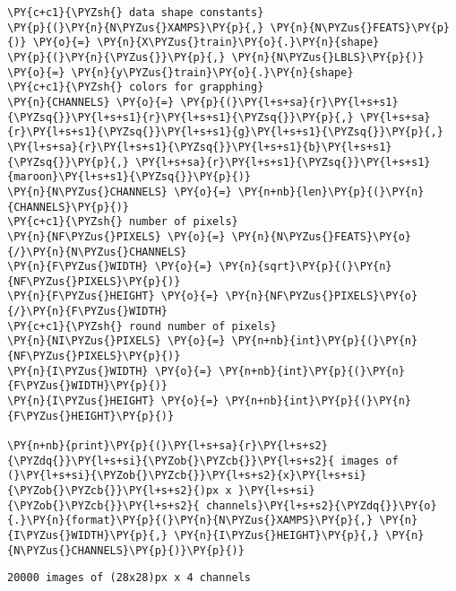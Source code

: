     \begin{tcolorbox}[breakable, size=fbox, boxrule=1pt, pad at break*=1mm,colback=cellbackground, colframe=cellborder]
\begin{Verbatim}[commandchars=\\\{\}]
\PY{c+c1}{\PYZsh{} data shape constants}
\PY{p}{(}\PY{n}{N\PYZus{}XAMPS}\PY{p}{,} \PY{n}{N\PYZus{}FEATS}\PY{p}{)} \PY{o}{=} \PY{n}{X\PYZus{}train}\PY{o}{.}\PY{n}{shape}
\PY{p}{(}\PY{n}{\PYZus{}}\PY{p}{,} \PY{n}{N\PYZus{}LBLS}\PY{p}{)} \PY{o}{=} \PY{n}{y\PYZus{}train}\PY{o}{.}\PY{n}{shape}
\PY{c+c1}{\PYZsh{} colors for grapphing}
\PY{n}{CHANNELS} \PY{o}{=} \PY{p}{(}\PY{l+s+sa}{r}\PY{l+s+s1}{\PYZsq{}}\PY{l+s+s1}{r}\PY{l+s+s1}{\PYZsq{}}\PY{p}{,} \PY{l+s+sa}{r}\PY{l+s+s1}{\PYZsq{}}\PY{l+s+s1}{g}\PY{l+s+s1}{\PYZsq{}}\PY{p}{,} \PY{l+s+sa}{r}\PY{l+s+s1}{\PYZsq{}}\PY{l+s+s1}{b}\PY{l+s+s1}{\PYZsq{}}\PY{p}{,} \PY{l+s+sa}{r}\PY{l+s+s1}{\PYZsq{}}\PY{l+s+s1}{maroon}\PY{l+s+s1}{\PYZsq{}}\PY{p}{)}
\PY{n}{N\PYZus{}CHANNELS} \PY{o}{=} \PY{n+nb}{len}\PY{p}{(}\PY{n}{CHANNELS}\PY{p}{)}
\PY{c+c1}{\PYZsh{} number of pixels}
\PY{n}{NF\PYZus{}PIXELS} \PY{o}{=} \PY{n}{N\PYZus{}FEATS}\PY{o}{/}\PY{n}{N\PYZus{}CHANNELS}
\PY{n}{F\PYZus{}WIDTH} \PY{o}{=} \PY{n}{sqrt}\PY{p}{(}\PY{n}{NF\PYZus{}PIXELS}\PY{p}{)}
\PY{n}{F\PYZus{}HEIGHT} \PY{o}{=} \PY{n}{NF\PYZus{}PIXELS}\PY{o}{/}\PY{n}{F\PYZus{}WIDTH}
\PY{c+c1}{\PYZsh{} round number of pixels}
\PY{n}{NI\PYZus{}PIXELS} \PY{o}{=} \PY{n+nb}{int}\PY{p}{(}\PY{n}{NF\PYZus{}PIXELS}\PY{p}{)}
\PY{n}{I\PYZus{}WIDTH} \PY{o}{=} \PY{n+nb}{int}\PY{p}{(}\PY{n}{F\PYZus{}WIDTH}\PY{p}{)}
\PY{n}{I\PYZus{}HEIGHT} \PY{o}{=} \PY{n+nb}{int}\PY{p}{(}\PY{n}{F\PYZus{}HEIGHT}\PY{p}{)}

\PY{n+nb}{print}\PY{p}{(}\PY{l+s+sa}{r}\PY{l+s+s2}{\PYZdq{}}\PY{l+s+si}{\PYZob{}\PYZcb{}}\PY{l+s+s2}{ images of (}\PY{l+s+si}{\PYZob{}\PYZcb{}}\PY{l+s+s2}{x}\PY{l+s+si}{\PYZob{}\PYZcb{}}\PY{l+s+s2}{)px x }\PY{l+s+si}{\PYZob{}\PYZcb{}}\PY{l+s+s2}{ channels}\PY{l+s+s2}{\PYZdq{}}\PY{o}{.}\PY{n}{format}\PY{p}{(}\PY{n}{N\PYZus{}XAMPS}\PY{p}{,} \PY{n}{I\PYZus{}WIDTH}\PY{p}{,} \PY{n}{I\PYZus{}HEIGHT}\PY{p}{,} \PY{n}{N\PYZus{}CHANNELS}\PY{p}{)}\PY{p}{)}
\end{Verbatim}
\end{tcolorbox}

    \begin{Verbatim}[commandchars=\\\{\}]
20000 images of (28x28)px x 4 channels
    \end{Verbatim}

